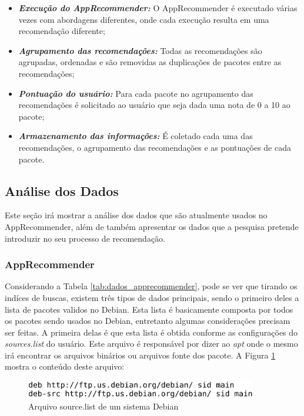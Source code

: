 \begin{itemize}
    \item \textit{\textbf{Execução do AppRecommender:}} O AppRecommender é
        executado várias vezes com abordagens diferentes, onde cada execução resulta em uma recomendação diferente;
    \item \textit{\textbf{Agrupamento das recomendações:}} Todas as recomendações são agrupadas, ordenadas e são removidas as duplicações de pacotes entre as recomendações;
    \item \textit{\textbf{Pontuação do usuário:}} Para cada pacote no agrupamento das recomendações é solicitado ao usuário que seja dada uma nota de 0 a 10 ao pacote;
    \item \textit{\textbf{Armazenamento das informações:}} É coletado cada uma das recomendações, o agrupamento das recomendações e as pontuações de cada pacote.
\end{itemize}

\subsection{Análise dos Dados}

Este seção irá mostrar a análise dos dados que são atualmente usados no
AppRecommender, além de também apresentar os dados que a pesquisa pretende
introduzir no seu processo de recomendação.

\subsubsection{AppRecommender} \label{engenharia_atributos}

Considerando a Tabela \ref{tab:dados_apprecommender}, pode se ver que tirando os
indíces de buscas, existem três tipos de dados principais, sendo o primeiro
deles a lista de pacotes validos no Debian. Esta lista é basicamente composta
por todos os pacotes sendo usados no Debian, entretanto algumas considerações
precisam ser feitas. A primeira delas é que esta lista é obtida conforme as
configurações do \textit{sources.list} do usuário. Este arquivo é responsável
por dizer ao \textit{apt} onde o mesmo irá encontrar os arquivos binários ou
arquivos fonte dos pacote. A Figura \ref{fig:source_list} mostra o conteúdo deste arquivo:
\\

\begin{figure}[h]
  \centering
  \includegraphics[width=0.9\textwidth]{figuras/source_list.eps}
  \caption{Arquivo source.list de um sistema Debian}
  \label{fig:source_list}
\end{figure}

